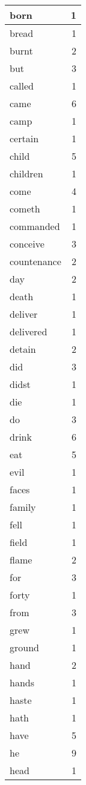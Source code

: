 \begin{center}
\begin{longtable}{l|r}
born & 1\\ \hline 
bread & 1\\ \hline 
burnt & 2\\ \hline 
but & 3\\ \hline 
called & 1\\ \hline 
came & 6\\ \hline 
camp & 1\\ \hline 
certain & 1\\ \hline 
child & 5\\ \hline 
children & 1\\ \hline 
come & 4\\ \hline 
cometh & 1\\ \hline 
commanded & 1\\ \hline 
conceive & 3\\ \hline 
countenance & 2\\ \hline 
day & 2\\ \hline 
death & 1\\ \hline 
deliver & 1\\ \hline 
delivered & 1\\ \hline 
detain & 2\\ \hline 
did & 3\\ \hline 
didst & 1\\ \hline 
die & 1\\ \hline 
do & 3\\ \hline 
drink & 6\\ \hline 
eat & 5\\ \hline 
evil & 1\\ \hline 
faces & 1\\ \hline 
family & 1\\ \hline 
fell & 1\\ \hline 
field & 1\\ \hline 
flame & 2\\ \hline 
for & 3\\ \hline 
forty & 1\\ \hline 
from & 3\\ \hline 
grew & 1\\ \hline 
ground & 1\\ \hline 
hand & 2\\ \hline 
hands & 1\\ \hline 
haste & 1\\ \hline 
hath & 1\\ \hline 
have & 5\\ \hline 
he & 9\\ \hline 
head & 1\\ \hline 

\end{longtable}
\end{center}
